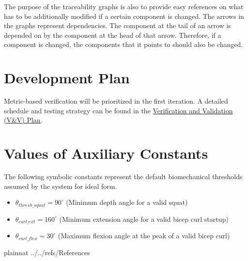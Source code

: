 \documentclass[12pt]{article}
\begin{document}
The purpose of the traceability graphs is also to provide easy references on
what has to be additionally modified if a certain component is changed.  The
arrows in the graphs represent dependencies. The component at the tail of an
arrow is depended on by the component at the head of that arrow. Therefore, if a
component is changed, the components that it points to should also be
changed.

\section{Development Plan}

Metric-based verification will be prioritized in the first iteration. A detailed schedule and testing strategy can be found in the \href{https://github.com/mmdmirh/cas741}{Verification and Validation (V\&V) Plan}.

\section{Values of Auxiliary Constants}

The following symbolic constants represent the default biomechanical thresholds assumed by the system for ideal form.

\begin{itemize}
    \item $\theta_{thresh\_squat} = 90^\circ$ (Minimum depth angle for a valid squat)
    \item $\theta_{curl\_ext} = 160^\circ$ (Minimum extension angle for a valid bicep curl startup)
    \item $\theta_{curl\_flex} = 30^\circ$ (Maximum flexion angle at the peak of a valid bicep curl)
\end{itemize}

\newpage

 {plainnat}
 {../../refs/References}

\newpage
\end{document}
